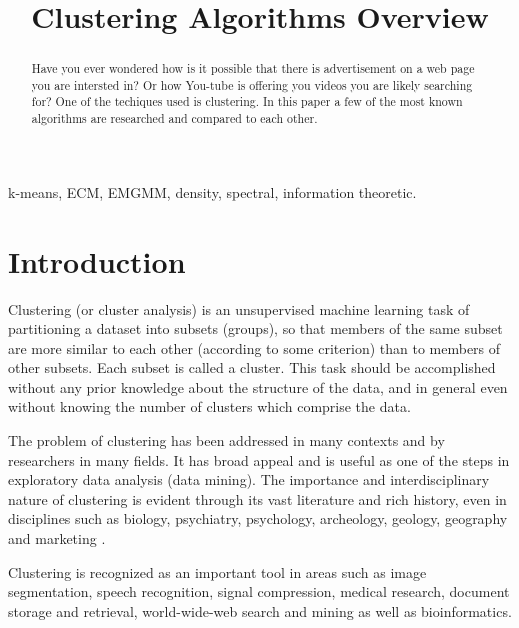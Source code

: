 \documentclass[conference]{IEEEtran}
\begin{document}
\title{Clustering Algorithms Overview}
\author{
}
\maketitle

\begin{abstract}
Have you ever wondered how is it possible that there is advertisement on a web page you
are intersted in? Or how You-tube is offering you videos you are likely searching for? 
One of the techiques used is clustering. In this paper a few of the most known
algorithms are researched and compared to each other.
\end{abstract}

\begin{IEEEkeywords}
k-means, ECM, EMGMM, density, spectral, information theoretic.
\end{IEEEkeywords}

\section{Introduction}
Clustering (or cluster analysis) is an unsupervised machine learning task of partitioning
a dataset into subsets (groups), so that members of the same subset are more similar to each other
(according to some criterion) than to members of other subsets. Each subset is called a cluster.
This task should be accomplished without any prior knowledge about the structure of the data, and in general
even without knowing the number of clusters which comprise the data.

The problem of clustering has been addressed in many contexts and by researchers in many fields. It has
broad appeal and is useful as one of the steps in exploratory data analysis (data mining). The importance
and interdisciplinary nature of clustering is evident through its vast literature and rich history, even
in disciplines such as biology, psychiatry, psychology, archeology, geology, geography and
marketing \cite{jaindubes88}.%

Clustering is recognized as an important tool in areas such as image segmentation,
speech recognition, signal compression, medical research, document storage and retrieval,
world-wide-web search and mining as well as bioinformatics.
\end{document}
